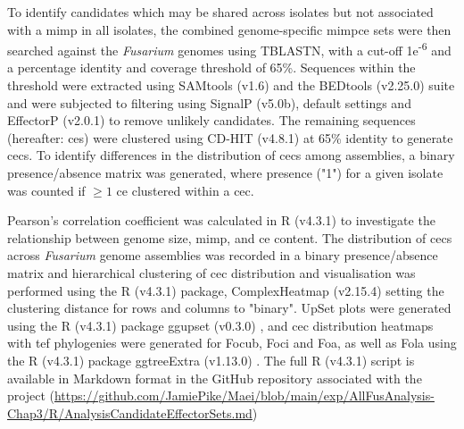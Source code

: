 To identify candidates which may be shared across isolates but not associated with a \ac{mimp} in all isolates, the combined genome-specific \ac{mimpce} sets were then searched against the \textit{Fusarium} genomes using TBLASTN, with a cut-off 1e\textsuperscript{-6} and a percentage identity and coverage threshold of 65\%. Sequences within the threshold were extracted using SAMtools (v1.6) and the BEDtools (v2.25.0) suite and were subjected to filtering using SignalP (v5.0b), default settings and EffectorP (v2.0.1) to remove unlikely candidates. The remaining sequences (hereafter: \acfp{ce}) were clustered using CD-HIT (v4.8.1) \parencite{Fu2012} at 65\% identity to generate \acp{cec}. To identify differences in the distribution of \acp{cec} among assemblies, a binary presence/absence matrix was generated, where presence ("1") for a given isolate was counted if $\geq1 $ \ac{ce} clustered within a \ac{cec}.

Pearson’s correlation coefficient was calculated in R (v4.3.1) \parencite{R} to investigate the relationship between genome size, \ac{mimp}, and \ac{ce} content. The distribution of \acp{cec} across \textit{Fusarium} genome assemblies was recorded in a binary presence/absence matrix and hierarchical clustering of \ac{cec} distribution and visualisation was performed using the R (v4.3.1) \parencite{R} package, ComplexHeatmap (v2.15.4)  \parencite{ComplexHeatmap} setting the clustering distance for rows and columns to "binary". UpSet plots were generated using the R (v4.3.1) \parencite{R} package ggupset (v0.3.0) \parencite{ggupset}, and \ac{cec} distribution heatmaps with \ac{tef} phylogenies were generated for \ac{Focub}, \ac{Foci} and \ac{Foa}, as well as \ac{Fola} using the R (v4.3.1) \parencite{R} package ggtreeExtra (v1.13.0) \parencite{ggtree}. The full R (v4.3.1) script is available in Markdown format in the GitHub repository associated with the project (\href{https://github.com/JamiePike/Maei/blob/main/exp/AllFusAnalysis-Chap3/R/AnalysisCandidateEffectorSets.md}{https://github.com/JamiePike/Maei/blob/mai\-n/exp/AllFusAnalysis-Chap3/R/AnalysisCandidateEffectorSets.md}) 

